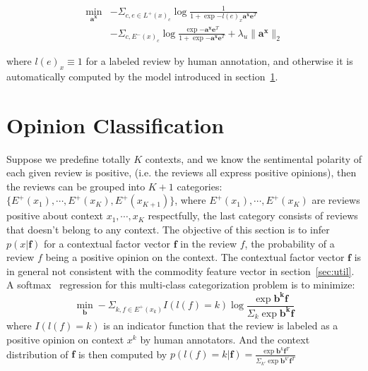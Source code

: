\documentclass[preprint,12pt]{elsarticle}
\begin{document}
\begin{equation}\label{equ:lossuu}
\begin{aligned}
    \min_{\mathbf{a^x}}& -\Sigma_{c,e\in L^+(x)_c} \log \frac{1}{1+\exp{-l(e)_x\mathbf{a^x}\mathbf{e}^T}}\\
    &-\Sigma_{c,E^-(x)_c} \log\frac{\exp{-\mathbf{a^x}\mathbf{e}^T}}{1+\exp{-\mathbf{a^x}\mathbf{e}^T}}+\lambda_u\|\mathbf{a^x}\|_2
\end{aligned}
\end{equation}

where $l(e)_x\equiv 1$ for a labeled review by human annotation, and otherwise it is automatically computed by the model introduced in section~\ref{sec:classifier}.

\section{Opinion Classification}\label{sec:classifier}
Suppose we predefine totally $K$ contexts, and we know the sentimental polarity of each given review is positive, (i.e. the reviews all express positive opinions), then the reviews can be grouped into $K\!+\!1$ categories: $\{E^+(x_1),\cdots, E^+(x_{K}), E^+(x_{K+1})\}$, where $E^+(x_1),\cdots, E^+(x_{K})$ are reviews positive about context $x_1,\cdots,x_K$ respectfully, the last category consists of reviews that doesn't belong to any context. The objective of this section is to infer $p(x|\mathbf{f})$ for a contextual factor vector $\mathbf{f}$ in the review $f$, the probability of a review $f$ being a positive opinion on the context. The contextual factor vector $\mathbf{f}$ is in general not consistent with the commodity feature vector in section~\ref{sec:util}. A softmax~\cite{Heckerman1997Models} regression for this multi-class categorization problem is to minimize:
\begin{equation}\label{equ:softmax}
  \min_{\mathbf{b}} -\Sigma_{k,f\in E^+(x_k)}I(l(f)=k)\log \frac{\exp{\mathbf{b^k}\mathbf{f}}}{\Sigma_k \exp{\mathbf{b^k}\mathbf{f}}}
\end{equation}
where $I(l(f)=k)$ is an indicator function that the review is labeled as a positive opinion on context $x^k$ by human annotators. And the context distribution of $\mathbf{f}$ is then computed by $p(l(f)=k|\mathbf{f})=\frac{\exp{\mathbf{b}^k\mathbf{f}^T}}{\Sigma_{k'}\exp{\mathbf{b}^{k'}\mathbf{f}^T}}$
\end{document}

